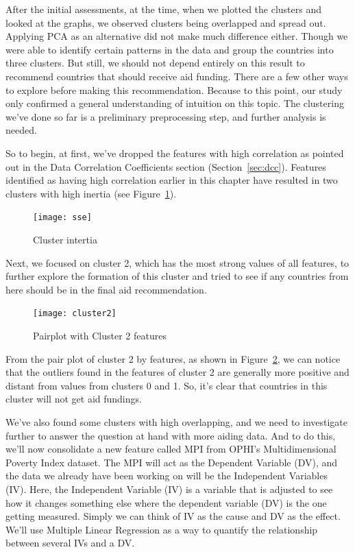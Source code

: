 \documentclass{swfuthesise}
\begin{document}
After the initial assessments, at the time, when we plotted the clusters and looked at the graphs, we observed clusters being overlapped and spread out. Applying PCA as an alternative did not make much difference either. Though we were able to identify certain patterns in the data and group the countries into three clusters. But still, we should not depend entirely on this result to recommend countries that should receive aid funding. There are a few other ways to explore before making this recommendation. Because to this point, our study only confirmed a general understanding of intuition on this topic. The clustering we've done so far is a preliminary preprocessing step, and further analysis is needed.
  
So to begin, at first, we've dropped the features with high correlation as pointed out in the Data Correlation Coefficients section (Section~\ref{sec:dcc}). Features identified as having high correlation earlier in this chapter have resulted in two clusters with high inertia (see Figure~\ref{fig:sse}).

\begin{figure}[!htp]
  \centering \texttt{[image: sse]}
  \caption{Cluster intertia\label{fig:sse}}  
\end{figure}

Next, we focused on cluster 2, which has the most strong values of all features, to further explore the formation of this cluster and tried to see if any countries from here should be in the final aid recommendation.

\begin{figure}[!htp]
  \centering \texttt{[image: cluster2]}
  \caption{Pairplot with Cluster 2 features\label{fig:cluster2}}
\end{figure}

From the pair plot of cluster 2 by features, as shown in Figure~\ref{fig:cluster2}, we can notice that the outliers found in the features of cluster 2 are generally more positive and distant from values from clusters 0 and 1. So, it's clear that countries in this cluster will not get aid fundings.

We've also found some clusters with high overlapping, and we need to investigate further to answer the question at hand with more aiding data. And to do this, we'll now consolidate a new feature called MPI from OPHI's Multidimensional Poverty Index dataset. The MPI will act as the Dependent Variable (DV), and the data we already have been working on will be the Independent Variables (IV). Here, the Independent Variable (IV) is a variable that is adjusted to see how it changes something else where the dependent variable (DV) is the one getting measured. Simply we can think of IV as the cause and DV as the effect. We'll use Multiple Linear Regression as a way to quantify the relationship between several IVs and a DV.
\end{document}
